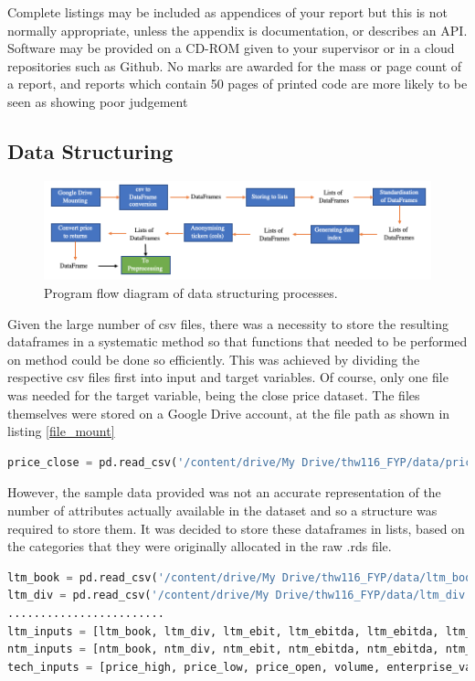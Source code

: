 \documentclass[10pt,onecolumn,letterpaper]{article}
\begin{document}
Complete listings may be included as appendices of your report but this is not normally appropriate, unless the appendix is documentation, or describes an API. Software may be provided on a CD-ROM given to your supervisor or in a cloud repositories such as Github. No marks are awarded for the mass or page count of a report, and reports which contain 50 pages of printed code are more likely to be seen as showing poor judgement
\fi

\subsection{Data Structuring}
 
\begin{figure}[!hbt!]
\centering
\includegraphics[width=\columnwidth]{data_structuring.png}
\caption{Program flow diagram of data structuring processes.}
\label{data_structuring}
\end{figure}
 
Given the large number of csv files, there was a necessity to store the resulting dataframes in a systematic method so that functions that needed to be performed on method could be done so efficiently. This was achieved by dividing the respective csv files first into input and target variables. Of course, only one file was needed for the target variable, being the close price dataset. The files themselves were stored on a Google Drive account, at the file path as shown in listing \ref{file_mount} 

\begin{lstlisting}[language=Python, breaklines=true, label = {file_mount}]
price_close = pd.read_csv('/content/drive/My Drive/thw116_FYP/data/price_close.csv')
\end{lstlisting}

However, the sample data provided was not an accurate representation of the number of attributes actually available in the dataset and so a structure was required to store them. It was decided to store these dataframes in lists, based on the categories that they were originally allocated in the raw .rds file. 

\begin{lstlisting}[language=Python, breaklines=true]
ltm_book = pd.read_csv('/content/drive/My Drive/thw116_FYP/data/ltm_book.csv')
ltm_div = pd.read_csv('/content/drive/My Drive/thw116_FYP/data/ltm_div.csv')
........................
ltm_inputs = [ltm_book, ltm_div, ltm_ebit, ltm_ebitda, ltm_ebitda, ltm_eps, ltm_fcf, ltm_pbook, ltm_sales] 
ntm_inputs = [ntm_book, ntm_div, ntm_ebit, ntm_ebitda, ntm_ebitda, ntm_eps, ntm_fcf, ntm_pbook, ntm_sales]
tech_inputs = [price_high, price_low, price_open, volume, enterprise_val]
\end{lstlisting} 
\end{document}
